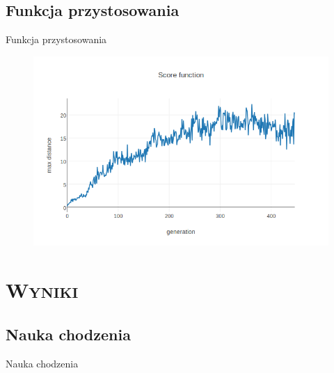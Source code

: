 \documentclass[xcolor=x11names,compress]{beamer}
\renewcommand{\(}{\begin{columns}}
\renewcommand{\)}{\end{columns}}
\newcommand{\<}[1]{\begin{column}{#1}}
\renewcommand{\>}{\end{column}}
\begin{document}
\subsection{Funkcja przystosowania}
\begin{frame}{Funkcja przystosowania}

	\begin{figure} \includegraphics[width=\textwidth]{score_function.png}  \end{figure}


\end{frame}

\section{\scshape Wyniki}
\subsection{Nauka chodzenia}
\begin{frame}{Nauka chodzenia}
\begin{center}
\end{center}
\end{frame}
\end{document}
